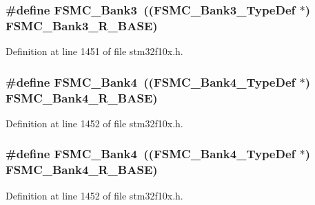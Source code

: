 \subsubsection[{\texorpdfstring{F\+S\+M\+C\+\_\+\+Bank3}{FSMC_Bank3}}]{\setlength{\rightskip}{0pt plus 5cm}\#define F\+S\+M\+C\+\_\+\+Bank3~(({\bf F\+S\+M\+C\+\_\+\+Bank3\+\_\+\+Type\+Def} $\ast$) {\bf F\+S\+M\+C\+\_\+\+Bank3\+\_\+\+R\+\_\+\+B\+A\+SE})}\hypertarget{group___peripheral__declaration_ga411eedc00b5b2b22b494004d4f41b736}{}\label{group___peripheral__declaration_ga411eedc00b5b2b22b494004d4f41b736}


Definition at line 1451 of file stm32f10x.\+h.

\subsubsection[{\texorpdfstring{F\+S\+M\+C\+\_\+\+Bank4}{FSMC_Bank4}}]{\setlength{\rightskip}{0pt plus 5cm}\#define F\+S\+M\+C\+\_\+\+Bank4~(({\bf F\+S\+M\+C\+\_\+\+Bank4\+\_\+\+Type\+Def} $\ast$) {\bf F\+S\+M\+C\+\_\+\+Bank4\+\_\+\+R\+\_\+\+B\+A\+SE})}\hypertarget{group___peripheral__declaration_ga5aa00e4ac522693c6a21bc23ef5a96df}{}\label{group___peripheral__declaration_ga5aa00e4ac522693c6a21bc23ef5a96df}


Definition at line 1452 of file stm32f10x.\+h.

\subsubsection[{\texorpdfstring{F\+S\+M\+C\+\_\+\+Bank4}{FSMC_Bank4}}]{\setlength{\rightskip}{0pt plus 5cm}\#define F\+S\+M\+C\+\_\+\+Bank4~(({\bf F\+S\+M\+C\+\_\+\+Bank4\+\_\+\+Type\+Def} $\ast$) {\bf F\+S\+M\+C\+\_\+\+Bank4\+\_\+\+R\+\_\+\+B\+A\+SE})}\hypertarget{group___peripheral__declaration_ga5aa00e4ac522693c6a21bc23ef5a96df}{}\label{group___peripheral__declaration_ga5aa00e4ac522693c6a21bc23ef5a96df}


Definition at line 1452 of file stm32f10x.\+h.

